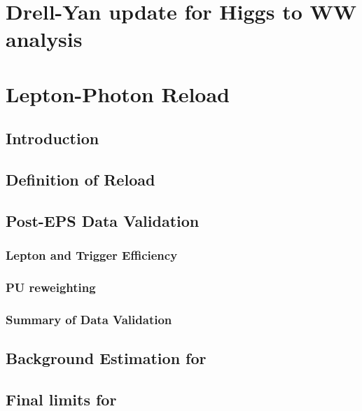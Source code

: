 \documentclass{cmspaper}
\begin{document}
  \section{Drell-Yan update for Higgs to WW analysis}
     \label{app:dy_writeup}
     

  \clearpage
  \section{Lepton-Photon Reload}
     \label{app:lp_reload}
     \subsection{Introduction}
     
     \subsection{Definition of Reload}
    \label{app:lp_technical_changes}
     

     \subsection{Post-EPS Data Validation}
     \label{app:lp_validation}
     \subsubsection{Lepton and Trigger Efficiency}
     
     \subsubsection{PU reweighting}
     
    \subsubsection{Summary of Data Validation}
    

     \subsection{Background Estimation for \lpintlumi}
    \label{app:lp_bkgestim}
     

     \subsection{Final limits for \lpintlumi}
    \label{app:lp_limits}
     
\end{document}
